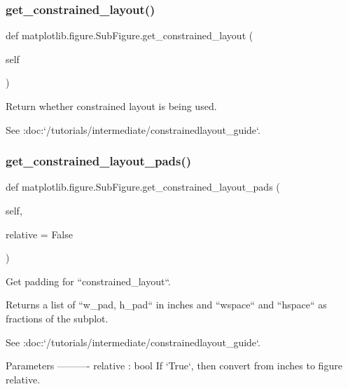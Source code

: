 \subsubsection{\texorpdfstring{get\+\_\+constrained\+\_\+layout()}{get\_constrained\_layout()}}
{\footnotesize\ttfamily def matplotlib.\+figure.\+Sub\+Figure.\+get\+\_\+constrained\+\_\+layout (\begin{DoxyParamCaption}\item[{}]{self }\end{DoxyParamCaption})}

\begin{DoxyVerb}Return whether constrained layout is being used.

See :doc:`/tutorials/intermediate/constrainedlayout_guide`.
\end{DoxyVerb}
 \mbox{\label{classmatplotlib_1_1figure_1_1SubFigure_ab51b41aafe2a90beabaffec591f2f87e}} 
\subsubsection{\texorpdfstring{get\+\_\+constrained\+\_\+layout\+\_\+pads()}{get\_constrained\_layout\_pads()}}
{\footnotesize\ttfamily def matplotlib.\+figure.\+Sub\+Figure.\+get\+\_\+constrained\+\_\+layout\+\_\+pads (\begin{DoxyParamCaption}\item[{}]{self,  }\item[{}]{relative = {\ttfamily False} }\end{DoxyParamCaption})}

\begin{DoxyVerb}Get padding for ``constrained_layout``.

Returns a list of ``w_pad, h_pad`` in inches and
``wspace`` and ``hspace`` as fractions of the subplot.

See :doc:`/tutorials/intermediate/constrainedlayout_guide`.

Parameters
----------
relative : bool
    If `True`, then convert from inches to figure relative.
\end{DoxyVerb}
 \mbox{\label{classmatplotlib_1_1figure_1_1SubFigure_aaf2b21d5b97d23345727b7ed49c6c165}} 

